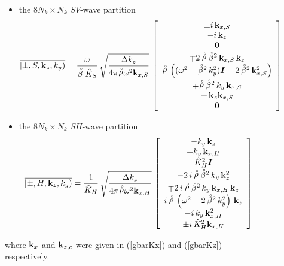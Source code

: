\begin{figure}
{\begin{minipage} {140.0mm}
\begin{itemize}
\item  the $8 \overline{N}_k \times \overline{N}_k$ $SV$-wave partition
\begin{equation} \label{hatSVxeigenSuper}
\overline{\left|\pm,S, {\bf k}_z,k_{y}  \right)}=
\frac{\omega }{\stackrel{\scriptscriptstyle _{\,\,\circ}}{ \beta} \hat{K}_{S}}\,\sqrt{\frac{{ \Delta} k_{z}}{{4 \pi {\stackrel{\scriptscriptstyle _{\,\,\circ}}{ \rho}} {\omega 
}^{  2}{\bf  k}_{  
x, S }}}}\,\left[\begin{array}{c} 
\pm i\,{\bf k}_{x,S}\\
- i\,{\bf k}_{z}\\ {\bf 0} \\
\mp 2\,{\stackrel{\scriptscriptstyle _{\,\,\circ}}{ \rho}}\,{{\stackrel{\scriptscriptstyle _{\,\,\circ}}{ \beta}}{}^{2}}\,{\bf k}_{x,S}\,{\bf k}_{z} \\
  {\stackrel{\scriptscriptstyle _{\,\,\circ}}{ \rho}} \,\left(({\omega^2} - {{\stackrel{\scriptscriptstyle _{\,\,\circ}}{ \beta}}{}^{2}}\,{k_{y}^2}) {\mbox{\boldmath$\mit I$\unboldmath}}-2\,{{\stackrel{\scriptscriptstyle _{\,\,\circ}}{ \beta}}{}^{2}}\,{{\bf k}_{x,S}^2}   \right) \\
 \mp {\stackrel{\scriptscriptstyle _{\,\,\circ}}{ \rho}}\,{{\stackrel{\scriptscriptstyle _{\,\,\circ}}{ \beta}}{}^{2}}\,k_{y}\,{\bf k}_{x,S}
 \\
\pm \,{\bf k}_{z} {\bf k}_{x,S}\\ {\bf 0} \end{array}\right]
\end{equation}

\item the $8 \overline{N}_k \times \overline{N}_k$ $SH$-wave partition
\begin{equation} \label{hatSHxeigenSuper}
\overline{\left|\pm,H, {\bf k}_z, k_{y}  \right)}=\frac{1 }{\hat{K}_{H}}\,
\sqrt{\frac{{ \Delta} k_{z}}{{4 \pi {\stackrel{\scriptscriptstyle _{\,\,\circ}}{ \rho}} {\omega 
}^{  2}{\bf  k}_{  
x, H }}}}\,\left[\begin{array}{c} 
- k_{y}\,{\bf k}_{z} \\ \mp k_{y}\,{\bf k}_{x,H} \\
  \hat{K}_{H}^2 {\mbox{\boldmath$\mit I$\unboldmath}}\\
-2\,i\,{\stackrel{\scriptscriptstyle _{\,\,\circ}}{ \rho}} \,{{\stackrel{\scriptscriptstyle _{\,\,\circ}}{ \beta}}{}^{2}}\,k_{y}\,{{\bf k}_{z}^2}\\
  \mp 2\,i\,{\stackrel{\scriptscriptstyle _{\,\,\circ}}{ \rho}}\,{{\stackrel{\scriptscriptstyle _{\,\,\circ}}{ \beta}}{}^{2}}\,k_{y}\,{\bf k}_{x,H}\,{\bf k}_{z} \\
   i\,{\stackrel{\scriptscriptstyle _{\,\,\circ}}{ \rho}}\,\left(  {\omega^2} -2\,{{\stackrel{\scriptscriptstyle _{\,\,\circ}}{ \beta}}{}^{2}}\,{k_{y}^2} 
  \right)\,{\bf k}_{z}
  \\ -i\, k_{y}\,{\bf k}^{2}_{x,H} \\
  \pm i\, \hat{K}_{H}^2 {\bf k}_{x,H}  \end{array}\right]
\end{equation}

\end{itemize}
where  ${\bf  k}_{x}$ and ${\bf  k}_{z,c}$ were given in
(\ref{gbarKx}) and (\ref{gbarKz}) respectively.
\vspace{2 mm}
\end{minipage}
}
\end{figure}


